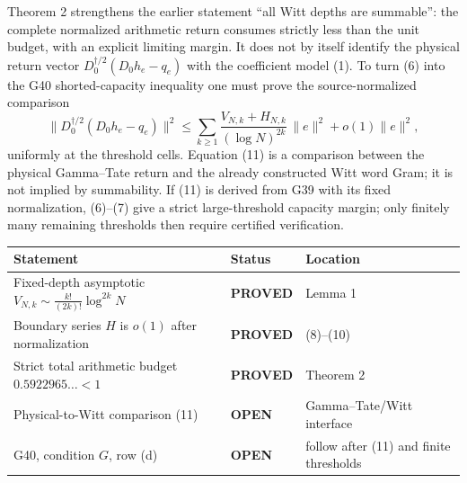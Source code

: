 \documentclass[11pt]{article}
\newcommand{\PROVED}{\textcolor{green!40!black}{\textbf{PROVED}}}
\newcommand{\OPEN}{\textcolor{red!70!black}{\textbf{OPEN}}}
\begin{document}
Theorem 2 strengthens the earlier statement ``all Witt depths are
summable'': the complete normalized arithmetic return consumes strictly
less than the unit budget, with an explicit limiting margin.  It does not
by itself identify the physical return vector
$D_0^{\dagger/2}(D_0h_e-q_e)$ with the coefficient model (1).  To turn
(6) into the G40 shorted-capacity inequality one must prove the
source-normalized comparison
\begin{equation}
 \bigl\|D_0^{\dagger/2}(D_0h_e-q_e)\bigr\|^2
 \le
 \sum_{k\ge1}\frac{V_{N,k}+H_{N,k}}{(\log N)^{2k}}\,\|e\|^2
 +o(1)\|e\|^2,                                                \tag{11}
\end{equation}
uniformly at the threshold cells.  Equation (11) is a comparison between
the physical Gamma--Tate return and the already constructed Witt word Gram;
it is not implied by summability.  If (11) is derived from G39 with its
fixed normalization, (6)--(7) give a strict large-threshold capacity
margin; only finitely many remaining thresholds then require certified
verification.

\begin{center}
\begin{tabular}{>{\raggedright\arraybackslash}p{.56\linewidth}
                >{\centering\arraybackslash}p{.15\linewidth}
                >{\raggedright\arraybackslash}p{.19\linewidth}}
\toprule
Statement & Status & Location \\
\midrule
Fixed-depth asymptotic $V_{N,k}\sim\frac{k!}{(2k)!}\log^{2k}N$ & \PROVED & Lemma 1 \\
Boundary series $H$ is $o(1)$ after normalization & \PROVED & (8)--(10) \\
Strict total arithmetic budget $0.5922965\ldots<1$ & \PROVED & Theorem 2 \\
Physical-to-Witt comparison (11) & \OPEN & Gamma--Tate/Witt interface \\
G40, condition $G$, row (d) & \OPEN & follow after (11) and finite thresholds \\
\bottomrule
\end{tabular}
\end{center}
\end{document}
